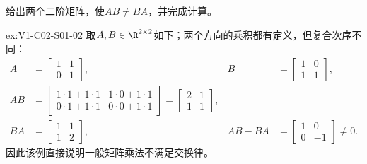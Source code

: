 \begin{SLChapterExercisePairSection}
\begin{exercise}[乘法次序]\label{ex:V1-C02-S01-02}
给出两个二阶矩阵，使$AB\ne BA$，并完成计算。
\end{exercise}
\label{sol:V1-C02-S01-02}
\begin{chapterexercisesolution}{ex:V1-C02-S01-02}
取$A,B\in\R^{2\times2}$如下；两个方向的乘积都有定义，但复合次序不同：
\[
\begin{aligned}
A&=\begin{bmatrix}1&1\\0&1\end{bmatrix},
&B&=\begin{bmatrix}1&0\\1&1\end{bmatrix},\\
AB&=\begin{bmatrix}1\cdot1+1\cdot1&1\cdot0+1\cdot1\\
0\cdot1+1\cdot1&0\cdot0+1\cdot1\end{bmatrix}
=\begin{bmatrix}2&1\\1&1\end{bmatrix},\\
BA&=\begin{bmatrix}1&1\\1&2\end{bmatrix},
&AB-BA&=\begin{bmatrix}1&0\\0&-1\end{bmatrix}\ne0.
\end{aligned}
\]
因此该例直接说明一般矩阵乘法不满足交换律。
\end{chapterexercisesolution}


\end{SLChapterExercisePairSection}
